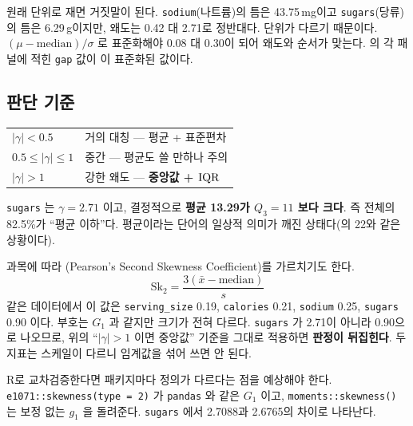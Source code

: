 \begin{pitfall}
원래 단위로 재면 거짓말이 된다. \texttt{sodium}(나트륨)의 틈은 43.75\,mg이고
\texttt{sugars}(당류)의 틈은 6.29\,g이지만, 왜도는 0.42 대 2.71로 정반대다.
단위가 다르기 때문이다. $(\mu - \mathrm{median})/\sigma$ 로 표준화해야
0.08 대 0.30이 되어 왜도와 순서가 맞는다. 의 각 패널에
적힌 \texttt{gap} 값이 이 표준화된 값이다.
\end{pitfall}

\subsection{판단 기준}

\begin{center}
\begin{tabular}{@{}ll@{}}
\toprule
$|\gamma| < 0.5$        & 거의 대칭 --- 평균 + 표준편차 \\
$0.5 \le |\gamma| \le 1$ & 중간 --- 평균도 쓸 만하나 주의 \\
$|\gamma| > 1$          & 강한 왜도 --- \textbf{중앙값 + $\mathrm{IQR}$} \\
\bottomrule
\end{tabular}
\end{center}

\texttt{sugars} 는 $\gamma = 2.71$ 이고, 결정적으로 \textbf{평균 13.29가
$Q_3 = 11$ 보다 크다}. 즉 전체의 82.5\%가 ``평균 이하''다. 평균이라는 단어의
일상적 의미가 깨진 상태다(의 22와 같은 상황이다).

\begin{pitfall}
과목에 따라 (Pearson's Second Skewness Coefficient)를
가르치기도 한다.
\[
  \mathrm{Sk}_2 = \frac{3(\bar{x} - \mathrm{median})}{s}
\]
같은 데이터에서 이 값은 \texttt{serving\_size} 0.19, \texttt{calories} 0.21,
\texttt{sodium} 0.25, \texttt{sugars} 0.90 이다. 부호는 $G_1$ 과 같지만 크기가 전혀
다르다. \texttt{sugars} 가 2.71이 아니라 0.90으로 나오므로, 위의 ``$|\gamma| > 1$ 이면
중앙값'' 기준을 그대로 적용하면 \textbf{판정이 뒤집힌다}. 두 지표는 스케일이 다르니
임계값을 섞어 쓰면 안 된다.
\end{pitfall}

\begin{aside}
R로 교차검증한다면 패키지마다 정의가 다르다는 점을 예상해야 한다.
\texttt{e1071::skewness(type = 2)} 가 \texttt{pandas} 와 같은 $G_1$ 이고,
\texttt{moments::skewness()} 는 보정 없는 $g_1$ 을 돌려준다. \texttt{sugars} 에서
2.7088과 2.6765의 차이로 나타난다.
\end{aside}

